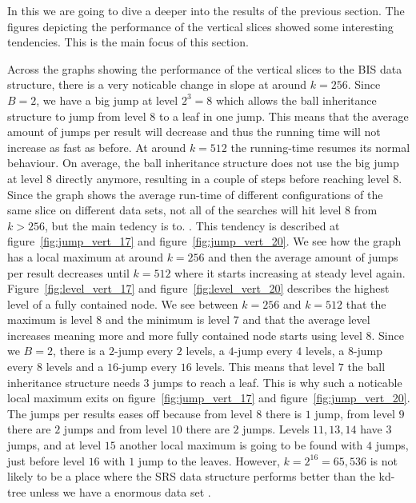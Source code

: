 In this we are going to dive a deeper into the results of the previous section. The figures depicting the performance of the vertical slices showed some interesting tendencies. This is the main focus of this section.


Across the graphs showing the performance of the vertical slices to the BIS data structure, there is a very noticable change in slope at around $k=256$. Since $B=2$, we have a big jump at level $2^3 = 8$ which allows the ball inheritance structure to jump from level $8$ to a leaf in one jump. This means that the average amount of jumps per result will decrease and thus the running time will not increase as fast as before. At around $k=512$ the running-time resumes its normal behaviour. On average, the ball inheritance structure does not use the big jump at level $8$ directly anymore, resulting in a couple of steps before reaching level $8$. Since the graph shows the average run-time of different configurations of the same slice on different data sets, not all of the searches will hit level $8$ from $k>256$, but the main tedency is to. . This tendency is described at figure~\ref{fig:jump_vert_17} and figure~\ref{fig:jump_vert_20}. We see how the graph has a local maximum at around $k=256$ and then the average amount of jumps per result decreases until $k=512$ where it starts increasing at steady level again. Figure~\ref{fig:level_vert_17} and figure~\ref{fig:level_vert_20} describes the highest level of a fully contained node. We see between $k=256$ and $k=512$ that the maximum is level $8$ and the minimum is level $7$ and that the average level increases meaning more and more fully contained node starts using level $8$. Since we $B=2$, there is a $2$-jump every $2$ levels, a $4$-jump every $4$ levels, a $8$-jump every $8$ levels and a $16$-jump every $16$ levels. This means that level $7$ the ball inheritance structure needs $3$ jumps to reach a leaf. This is why such a noticable local maximum exits on figure~\ref{fig:jump_vert_17} and figure~\ref{fig:jump_vert_20}. The jumps per results eases off because from level $8$ there is $1$ jump, from level $9$ there are $2$ jumps and from level $10$ there are $2$ jumps. Levels $11, 13, 14$ have $3$ jumps, and at level $15$ another local maximum is going to be found with $4$ jumps, just before level $16$ with $1$ jump to the leaves. However, $k=2^{16}=65,536$ is not likely to be a place where the SRS data structure performs better than the kd-tree unless we have a enormous data set . 


